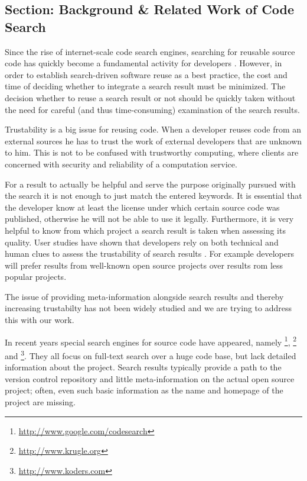 \subsection{Section: Background \& Related Work of Code Search}
\label{sec:relwork}

Since the rise of internet-scale code search engines, searching for reusable source code has quickly become a fundamental activity for developers \cite{Kuhn09b}. However, in order to establish search-driven software reuse as a best practice, the cost and time of deciding whether to integrate a search result must be minimized. The decision whether to reuse a search result or not should be quickly taken without the need for careful (and thus time-consuming) examination of the search results.

Trustability is a big issue for reusing code. When a developer reuses code from an external sources he has to trust the work of external developers that are unknown to him. This is not to be confused with trustworthy computing, where clients are concerned with security and reliability of a computation service.

For a result to actually be helpful and serve the purpose originally pursued with the search it is not enough to just match the entered keywords.
It is essential that the developer know at least the license under which certain source code was published, otherwise he will not be able to use it legally. Furthermore, it is very helpful to know from which project a search result is taken when assessing its quality.
User studies have shown that developers rely on both technical and human clues to assess the trustability of search results \cite{Gall09a}. For example developers will prefer results from well-known open source projects over results rom less popular projects.

The issue of providing meta-information alongside search results and thereby increasing trustabilty has not been widely studied and we are trying to address this with our work.

In recent years special search engines for source code have appeared, namely  \textsc{\gcs}\footnote{\url{http://www.google.com/codesearch}}, \textsc{\krugle}\footnote{\url{http://www.krugle.org}} and  \textsc{\koders}\footnote{\url{http://www.koders.com}}. They all focus on full-text search over a huge code base, but lack detailed information about the project. Search results typically provide a path to the version control repository and little meta-information on the actual open source project; often, even such basic information as the name and homepage of the project are missing.

